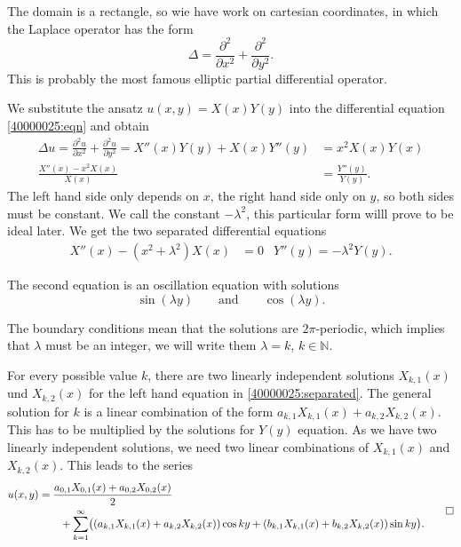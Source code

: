 \begin{loesung}
\begin{teilaufgaben}
\item
The domain is a rectangle, so wie have work on cartesian coordinates, in
which the Laplace operator has the form
\[
\Delta
=
\frac{\partial^2}{\partial x^2}
+
\frac{\partial^2}{\partial y^2}.
\]
This is probably the most famous elliptic partial differential operator.
\item
We substitute the ansatz $u(x,y) = X(x) Y(y)$ into the differential
equation \eqref{40000025:eqn} and obtain
\begin{align*}
\Delta u
=
\frac{\partial^2 u}{\partial x^2}
+
\frac{\partial^2 u}{\partial y^2}
=
X''(x)Y(y) + X(x)Y''(y)
&=
x^2 X(x)Y(x)
\\
\frac{X''(x)-x^2X(x)}{X(x)} &= \frac{Y''(y)}{Y(y)}.
\end{align*}
The left hand side only depends on $x$, the right hand side only on $y$,
so both sides must be constant.
We call the constant $-\lambda^2$, this particular form willl prove to
be ideal later.
We get the two separated differential equations
\begin{align}
X''(x)-(x^2+\lambda^2)X(x)&=0
&
Y''(y)=-\lambda^2 Y(y).
\label{40000025:separated}
\end{align}
\item
The second equation is an oscillation equation with solutions
\[
\sin(\lambda y)
\qquad\text{and}\qquad
\cos(\lambda y).
\]
\item
The boundary conditions mean that the solutions are $2\pi$-periodic,
which implies that $\lambda$ must be an integer, we will write them
$\lambda=k$, $k\in\mathbb N$.
\item
For every possible value $k$, there are two linearly independent 
solutions $X_{k,1}(x)$ und $X_{k,2}(x)$ for the left hand equation in
\eqref{40000025:separated}.
The general solution for $k$ is a linear combination of the form
$a_{k,1}X_{k,1}(x) + a_{k,2}X_{k,2}(x)$.
This has to be multiplied by the solutions for $Y(y)$ equation.
As we have two linearly independent solutions, we need two
linear combinations of $X_{k,1}(x)$ and $X_{k,2}(x)$.
This leads to the series
\begin{equation}
\begin{aligned}
u(x,y)
&=
\frac{a_{0,1}X_{0,1}(x)+a_{0,2}X_{0,2}(x)}{2}
\\
&\qquad
+\sum_{k=1}^\infty
\bigl(
(a_{k,1}X_{k,1}(x)+a_{k,2}X_{k,2}(x))\cos ky
+
(b_{k,1}X_{k,1}(x)+b_{k,2}X_{k,2}(x))\sin ky
\bigr).
\end{aligned}
\label{40000025:series}
\qedhere
\end{equation}
\end{teilaufgaben}
\end{loesung}

